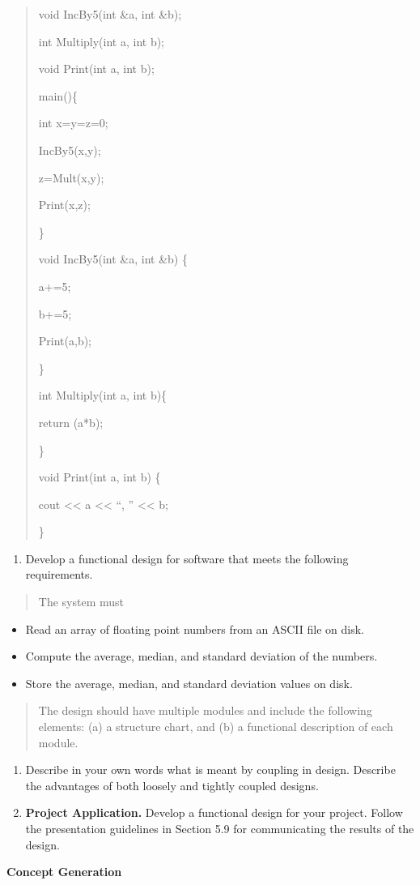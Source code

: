 \begin{quote}
void IncBy5(int \&a, int \&b);

int Multiply(int a, int b);

void Print(int a, int b);

main()\{

int x=y=z=0;

IncBy5(x,y);

z=Mult(x,y);

Print(x,z);

\}

void IncBy5(int \&a, int \&b) \{

a+=5;

b+=5;

Print(a,b);

\}

int Multiply(int a, int b)\{

return (a*b);

\}

void Print(int a, int b) \{

cout \textless\textless{} a \textless\textless{} ``, ''
\textless\textless{} b;

\}
\end{quote}

\begin{enumerate}
\def\labelenumi{\arabic{enumi}.}
\setcounter{enumi}{1}
\item
  Develop a functional design for software that meets the following
  requirements.
\end{enumerate}

\begin{quote}
The system must
\end{quote}

\begin{itemize}
\item
  Read an array of floating point numbers from an ASCII file on disk.
\item
  Compute the average, median, and standard deviation of the numbers.
\item
  Store the average, median, and standard deviation values on disk.
\end{itemize}

\begin{quote}
The design should have multiple modules and include the following
elements: (a) a structure chart, and (b) a functional description of
each module.
\end{quote}

\begin{enumerate}
\def\labelenumi{\arabic{enumi}.}
\item
  Describe in your own words what is meant by coupling in design.
  Describe the advantages of both loosely and tightly coupled designs.
\item
  \textbf{Project Application.} Develop a functional design for your
  project. Follow the presentation guidelines in Section 5.9 for
  communicating the results of the design.
\end{enumerate}

\textbf{Concept Generation}

